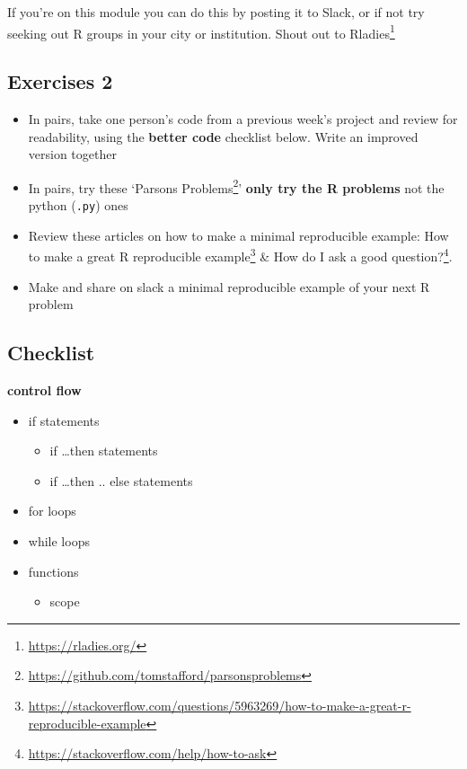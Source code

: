 \documentclass[
  12pt,
  a5paper,
]{book}
\DeclareRobustCommand{\href}[2]{#2\footnote{\url{#1}}}
\providecommand{\tightlist}{%
  \setlength{\itemsep}{0pt}\setlength{\parskip}{0pt}}
\begin{document}
If you're on this module you can do this by posting it to Slack, or if not try seeking out R groups in your city or institution. Shout out to \href{https://rladies.org/}{Rladies}

\hypertarget{exercises-2-1}{%
\subsection{Exercises 2}\label{exercises-2-1}}

\begin{itemize}
\tightlist
\item
  In pairs, take one person's code from a previous week's project and review for readability, using the \textbf{better code} checklist below. Write an improved version together
\item
  In pairs, try these `\href{https://github.com/tomstafford/parsonsproblems}{Parsons Problems}' \textbf{only try the R problems} not the python (\texttt{.py}) ones
\item
  Review these articles on how to make a minimal reproducible example: \href{https://stackoverflow.com/questions/5963269/how-to-make-a-great-r-reproducible-example}{How to make a great R reproducible example} \& \href{https://stackoverflow.com/help/how-to-ask}{How do I ask a good question?}.
\item
  Make and share on slack a minimal reproducible example of your next R problem
\end{itemize}

\hypertarget{checklist-4}{%
\subsection{Checklist}\label{checklist-4}}

\textbf{control flow}

\begin{itemize}
\tightlist
\item
  if statements

  \begin{itemize}
  \tightlist
  \item
    if \ldots then statements
  \item
    if \ldots then .. else statements
  \end{itemize}
\item
  for loops
\item
  while loops
\item
  functions

  \begin{itemize}
  \tightlist
  \item
    scope
  \end{itemize}
\end{itemize}
\end{document}
